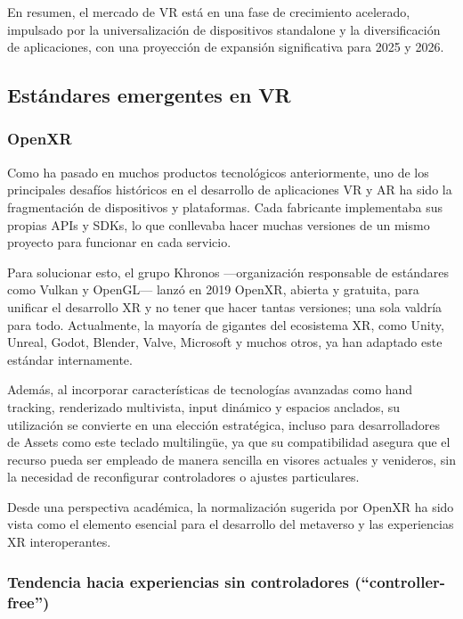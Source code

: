 En resumen, el mercado de VR está en una fase de crecimiento acelerado, impulsado por la universalización de dispositivos standalone y la diversificación de aplicaciones, con una proyección de expansión significativa para 2025 y 2026. \cite{Wohlgenannt2020Virtual}\cite{Hennig-Thurau2024EXPRESS:}\cite{Rendevski2022PC}


\subsection{Estándares emergentes en VR}

\subsubsection{OpenXR}

Como ha pasado en muchos productos tecnológicos anteriormente, uno de los principales desafíos históricos en el desarrollo de aplicaciones VR y AR ha sido la fragmentación de dispositivos y plataformas. Cada fabricante implementaba sus propias APIs y SDKs, lo que conllevaba hacer muchas versiones de un mismo proyecto para funcionar en cada servicio.

Para solucionar esto, el grupo Khronos —organización responsable de estándares como Vulkan y OpenGL— lanzó en 2019 OpenXR, abierta y gratuita, para unificar el desarrollo XR y no tener que hacer tantas versiones; una sola valdría para todo. Actualmente, la mayoría de gigantes del ecosistema XR, como Unity, Unreal, Godot, Blender, Valve, Microsoft y muchos otros, ya han adaptado este estándar internamente. \cite{openxr2024}

Además, al incorporar características de tecnologías avanzadas como hand tracking, renderizado multivista, input dinámico y espacios anclados, su utilización se convierte en una elección estratégica, incluso para desarrolladores de Assets como este teclado multilingüe, ya que su compatibilidad asegura que el recurso pueda ser empleado de manera sencilla en visores actuales y venideros, sin la necesidad de reconfigurar controladores o ajustes particulares. \cite{openxr2024}

Desde una perspectiva académica, la normalización sugerida por OpenXR ha sido vista como el elemento esencial para el desarrollo del metaverso y las experiencias XR interoperantes. \cite{nabors2023openxr}

\subsubsection{Tendencia hacia experiencias sin controladores (``controller-free'')}

